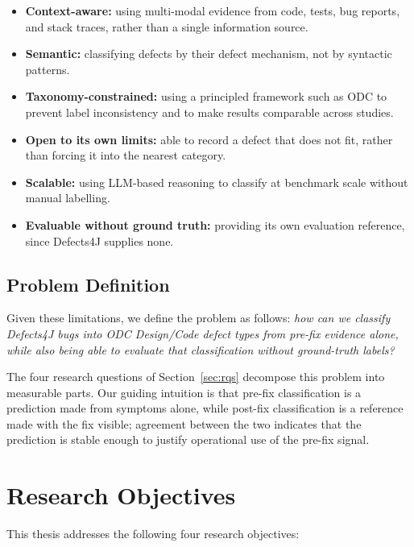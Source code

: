 \documentclass{iutbscthesis}
\begin{document}
\begin{itemize}
    \item \textbf{Context-aware:} using multi-modal evidence from code, tests, bug reports, and stack traces, rather than a single information source.
    \item \textbf{Semantic:} classifying defects by their defect mechanism, not by syntactic patterns.
    \item \textbf{Taxonomy-constrained:} using a principled framework such as ODC to prevent label inconsistency and to make results comparable across studies.
    \item \textbf{Open to its own limits:} able to record a defect that does not fit, rather than forcing it into the nearest category.
    \item \textbf{Scalable:} using LLM-based reasoning to classify at benchmark scale without manual labelling.
    \item \textbf{Evaluable without ground truth:} providing its own evaluation reference, since Defects4J supplies none.
\end{itemize}

\subsection{Problem Definition}

Given these limitations, we define the problem as follows: \emph{how can we classify Defects4J bugs into ODC Design/Code defect types from pre-fix evidence alone, while also being able to evaluate that classification without ground-truth labels?}

The four research questions of Section~\ref{sec:rqs} decompose this problem into measurable parts. Our guiding intuition is that pre-fix classification is a prediction made from symptoms alone, while post-fix classification is a reference made with the fix visible; agreement between the two indicates that the prediction is stable enough to justify operational use of the pre-fix signal.

\section{Research Objectives}

This thesis addresses the following four research objectives:
\end{document}
